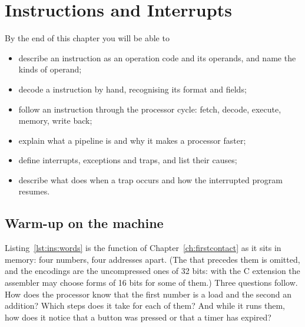 \chapter{Instructions and Interrupts}
\label{ch:instructions}


\begin{chapgoals}
By the end of this chapter you will be able to
\begin{itemize}
\item describe an instruction as an operation code and its operands, and name the kinds of operand;
\item decode a \riscv instruction by hand, recognising its format and fields;
\item follow an instruction through the processor cycle: fetch, decode, execute, memory, write back;
\item explain what a pipeline is and why it makes a processor faster;
\item define interrupts, exceptions and traps, and list their causes;
\item describe what \riscv does when a trap occurs and how the interrupted program resumes.
\end{itemize}
\end{chapgoals}


\section{Warm-up on the machine}


Listing~\ref{lst:ins:words} is the function  of
Chapter~\ref{ch:firstcontact} as it sits in memory: four numbers, four
addresses apart. (The  that precedes them is omitted, and the
encodings are the uncompressed ones of 32 bits: with the C extension the
assembler may choose forms of 16 bits for some of them.) Three questions
follow. How does the processor know that the first number is a load and the
second an addition? Which steps does it take for each of them? And while it
runs them, how does it notice that a button was pressed or that a timer has
expired?

